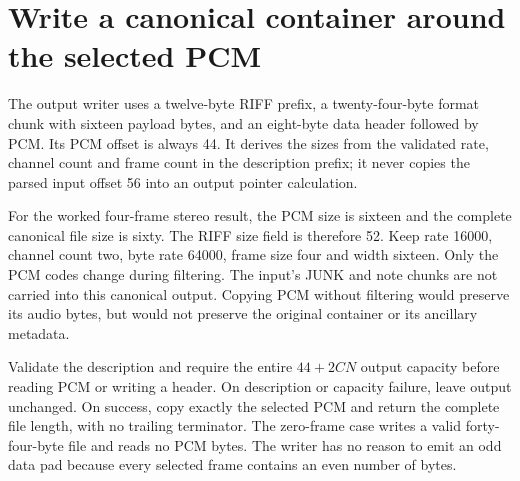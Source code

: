 \section{Write a canonical container around the selected PCM}
The output writer uses a twelve-byte RIFF prefix, a twenty-four-byte format chunk
with sixteen payload bytes, and an eight-byte data header followed by PCM. Its PCM
offset is always 44. It derives the sizes from the validated rate, channel count and
frame count in the description prefix; it never copies the parsed input offset 56
into an output pointer calculation.

For the worked four-frame stereo result, the PCM size is sixteen and the complete
canonical file size is sixty. The RIFF size field is therefore 52. Keep rate 16000,
channel count two, byte rate 64000, frame size four and width sixteen. Only the PCM
codes change during filtering. The input's JUNK and note chunks are not carried into
this canonical output. Copying PCM without filtering would preserve its audio bytes, but would not
preserve the original container or its ancillary metadata.

Validate the description and require the entire $44+2CN$ output capacity before
reading PCM or writing a header. On description or capacity failure, leave output
unchanged. On success, copy exactly the selected PCM and return the complete file
length, with no trailing terminator. The zero-frame case writes a valid forty-four-byte
file and reads no PCM bytes. The writer has no reason to emit an odd data pad because
every selected frame contains an even number of bytes.
